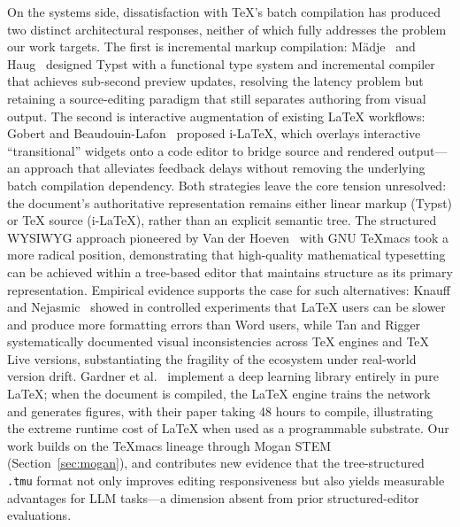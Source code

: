 On the systems side, dissatisfaction with \TeX{}'s batch compilation has produced two distinct architectural responses, neither of which fully addresses the problem our work targets. The first is incremental markup compilation: M\"{a}dje~\cite{madje2023typst} and Haug~\cite{haug2022typst} designed Typst with a functional type system and incremental compiler that achieves sub-second preview updates, resolving the latency problem but retaining a source-editing paradigm that still separates authoring from visual output. The second is interactive augmentation of existing \LaTeX{} workflows: Gobert and Beaudouin-Lafon~\cite{gobert2022ilatex} proposed i-\LaTeX{}, which overlays interactive ``transitional'' widgets onto a code editor to bridge source and rendered output---an approach that alleviates feedback delays without removing the underlying batch compilation dependency. Both strategies leave the core tension unresolved: the document's authoritative representation remains either linear markup (Typst) or \TeX{} source (i-\LaTeX{}), rather than an explicit semantic tree. The structured WYSIWYG approach pioneered by Van der Hoeven~\cite{van_der_hoeven_gnu_2001} with GNU \TeX{}macs took a more radical position, demonstrating that high-quality mathematical typesetting can be achieved within a tree-based editor that maintains structure as its primary representation. Empirical evidence supports the case for such alternatives: Knauff and Nejasmic~\cite{knauff2014efficiency} showed in controlled experiments that \LaTeX{} users can be slower and produce more formatting errors than Word users, while Tan and Rigger~\cite{tan2024inconsistencies} systematically documented visual inconsistencies across \TeX{} engines and TeX Live versions, substantiating the fragility of the ecosystem under real-world version drift. Gardner et al.~\cite{gardner2025neuralatex} implement a deep learning library entirely in pure \LaTeX{}; when the document is compiled, the \LaTeX{} engine trains the network and generates figures, with their paper taking 48 hours to compile, illustrating the extreme runtime cost of \LaTeX{} when used as a programmable substrate. Our work builds on the \TeX{}macs lineage through Mogan STEM (Section~\ref{sec:mogan}), and contributes new evidence that the tree-structured \texttt{.tmu} format not only improves editing responsiveness but also yields measurable advantages for LLM tasks---a dimension absent from prior structured-editor evaluations.
